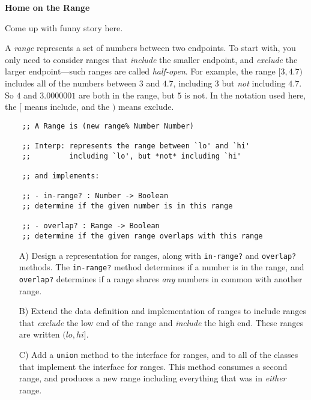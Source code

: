 \documentclass[12pt]{article}                   %
\def\pts#1{\marginpar{\footnotesize \raggedright  \fbox{#1 {\sc Points}}}}
\begin{document}
\vfill\thispagestyle{empty}
\newpage

\fi


\noindent
{\bf Home on the Range}

Come up with funny story here.



\newpage
\begin{problem}\pts{16}
\noindent 

A \emph{range} represents a set of numbers between two endpoints.  To
start with, you only need to consider ranges that \emph{include} the
smaller endpoint, and \emph{exclude} the larger endpoint---such ranges
are called \emph{half-open}.  For example, the range $[3,4.7)$
includes all of the numbers between $3$ and $4.7$, including $3$ but
\emph{not} including $4.7$. So $4$ and $3.0000001$ are both in the
range, but $5$ is not.  In the notation used here, the $[$ means
include, and the $)$ means exclude.

\begin{verbatim}
    ;; A Range is (new range% Number Number)

    ;; Interp: represents the range between `lo' and `hi'
    ;;         including `lo', but *not* including `hi'

    ;; and implements:

    ;; - in-range? : Number -> Boolean
    ;; determine if the given number is in this range

    ;; - overlap? : Range -> Boolean 
    ;; determine if the given range overlaps with this range
\end{verbatim}

\smallskip

\noindent
\begin{itemize}
\item[A)\;] Design a representation for ranges, along with
  \texttt{in-range?} and \texttt{overlap?} methods.
  The \texttt{in-range?} method determines if a number is in the range, and
  \texttt{overlap?} determines if a range shares \emph{any} numbers in
  common with another range.

\item[B)\;] Extend the data definition and implementation of ranges to
  include ranges that \emph{exclude} the low end of the range and
  \emph{include} the high end.  These ranges are written $(lo,hi]$.  

\item[C)\;] Add a \texttt{union} method to the interface for ranges,
  and to all of the classes that implement the interface for ranges.
  This method consumes a second range, and produces a new range including
  everything that was in \emph{either} range. 


\end{itemize}
\end{problem}
\end{document}
